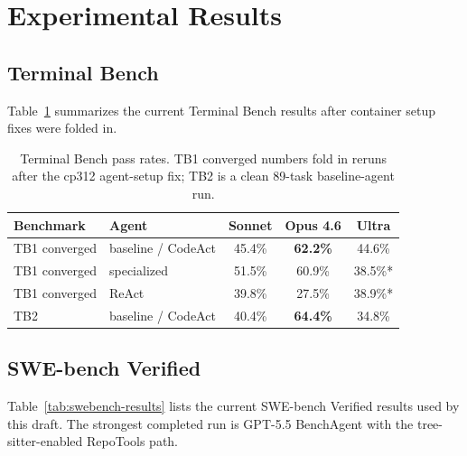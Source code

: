 \documentclass[11pt, logo, onecolumn, copyright, colorlinks=true, allcolors=blue]{nvidiatechreport}
\begin{document}

\section{Experimental Results}
\label{sec:evaluation}

\subsection{Terminal Bench}
\label{sec:evaluation:terminal-bench}

Table~\ref{tab:tb-results} summarizes the current Terminal Bench results after
container setup fixes were folded in.

\begin{table}[h]
\centering
\caption{Terminal Bench pass rates. TB1 converged numbers fold in reruns after
the cp312 agent-setup fix; TB2 is a clean 89-task baseline-agent run.}
\label{tab:tb-results}
\begin{tabular}{llccc}
\toprule
\textbf{Benchmark} & \textbf{Agent} & \textbf{Sonnet} & \textbf{Opus 4.6} & \textbf{Ultra} \\
\midrule
TB1 converged & baseline / CodeAct & 45.4\% & \textbf{62.2\%} & 44.6\% \\
TB1 converged & specialized & 51.5\% & 60.9\% & 38.5\%* \\
TB1 converged & ReAct & 39.8\% & 27.5\% & 38.9\%* \\
TB2 & baseline / CodeAct & 40.4\% & \textbf{64.4\%} & 34.8\% \\
\bottomrule
\end{tabular}
\end{table}

\subsection{SWE-bench Verified}
\label{sec:evaluation:swebench}

Table~\ref{tab:swebench-results} lists the current SWE-bench Verified results
used by this draft. The strongest completed run is GPT-5.5 BenchAgent with the
tree-sitter-enabled RepoTools path.
\end{document}

